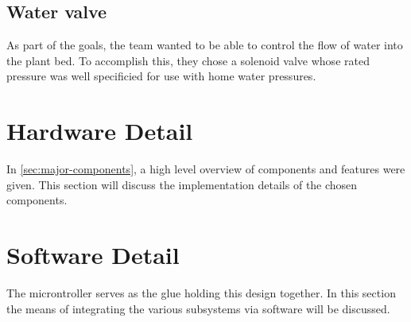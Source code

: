 \documentclass[journal]{IEEEtran}
\begin{document}
\subsection{Water valve}
As part of the goals, the team wanted to be able to control the flow of water
into the plant bed. To accomplish this, they chose a solenoid valve whose rated pressure was well specificied for use with home water pressures.
\section{Hardware Detail}
In \autoref{sec:major-components}, a high level overview of components and features were given. This
section will discuss the implementation details of the chosen components.
\section{Software Detail}
The microntroller serves as the glue holding this design together. In this section the means of
integrating the various subsystems via software will be discussed.
\end{document}
